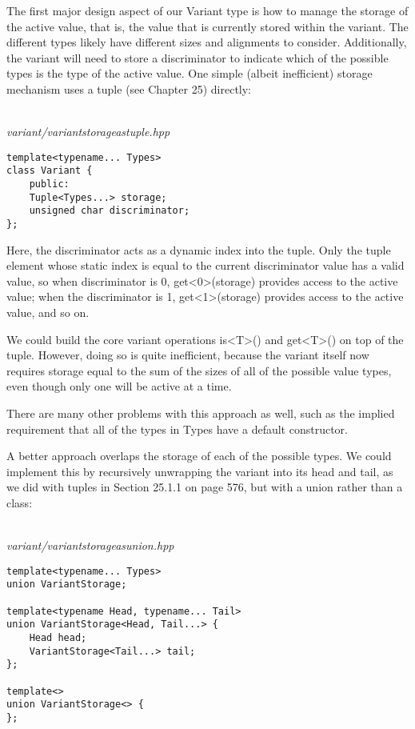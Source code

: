 The first major design aspect of our Variant type is how to manage the storage of the active value, that is, the value that is currently stored within the variant. The different types likely have different sizes and alignments to consider. Additionally, the variant will need to store a discriminator to indicate which of the possible types is the type of the active value. One simple (albeit inefficient) storage mechanism uses a tuple (see Chapter 25) directly:

\hspace*{\fill} \\ %
\noindent
\textit{variant/variantstorageastuple.hpp}
\begin{lstlisting}[style=styleCXX]
template<typename... Types>
class Variant {
	public:
	Tuple<Types...> storage;
	unsigned char discriminator;
};
\end{lstlisting}

Here, the discriminator acts as a dynamic index into the tuple. Only the tuple element whose static index is equal to the current discriminator value has a valid value, so when discriminator is 0, get<0>(storage) provides access to the active value; when the discriminator is 1, get<1>(storage) provides access to the active value, and so on.

We could build the core variant operations is<T>() and get<T>() on top of the tuple. However, doing so is quite inefficient, because the variant itself now requires storage equal to the sum of the sizes of all of the possible value types, even though only one will be active at a time.

\begin{tcolorbox}[colback=webgreen!5!white,colframe=webgreen!75!black]
\hspace*{0.75cm}There are many other problems with this approach as well, such as the implied requirement that all of the types in Types have a default constructor.
\end{tcolorbox}

A better approach overlaps the storage of each of the possible types. We could implement this by recursively unwrapping the variant into its head and tail, as we did with tuples in Section 25.1.1 on page 576, but with a union rather than a class:

\hspace*{\fill} \\ %
\noindent
\textit{variant/variantstorageasunion.hpp}
\begin{lstlisting}[style=styleCXX]
template<typename... Types>
union VariantStorage;

template<typename Head, typename... Tail>
union VariantStorage<Head, Tail...> {
	Head head;
	VariantStorage<Tail...> tail;
};

template<>
union VariantStorage<> {
};
\end{lstlisting}

